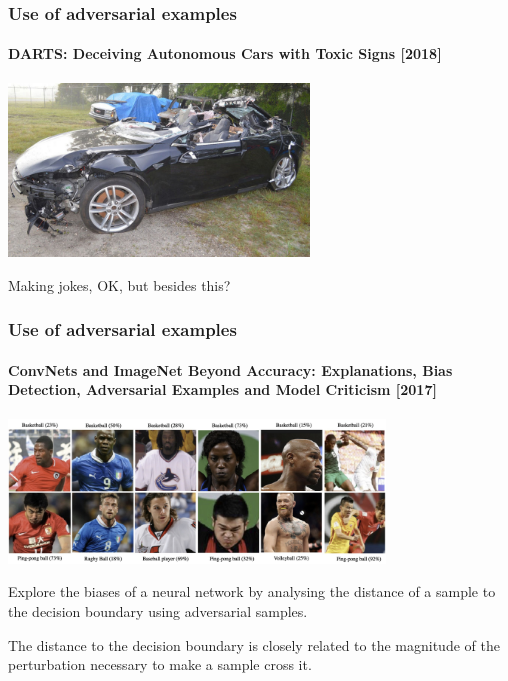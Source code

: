 \documentclass[9pt]{beamer}
\begin{document}
\begin{frame}
  \frametitle{Use of adversarial examples}

  \framesubtitle{DARTS: Deceiving Autonomous Cars with Toxic Signs [2018]}

  \begin{center}
    \includegraphics[width = 8cm]{images/car_crash.jpg}
  \end{center}

  \bigskip

  Making jokes, OK, but besides this?
\end{frame}

\begin{frame}

  \frametitle{Use of adversarial examples}

  \framesubtitle{ConvNets and ImageNet Beyond Accuracy: Explanations,
    Bias Detection, Adversarial Examples and Model Criticism [2017]}

  \begin{center}
    \includegraphics[width = 10cm]{images/imagenet_bias.png}
  \end{center}

  \bigskip
  Explore the biases of a neural network by analysing the distance of
  a sample to the decision boundary using adversarial samples.

  \medskip

  The distance to the decision boundary is closely related to the
  magnitude of the perturbation necessary to make a sample cross it.
\end{frame}
\end{document}
